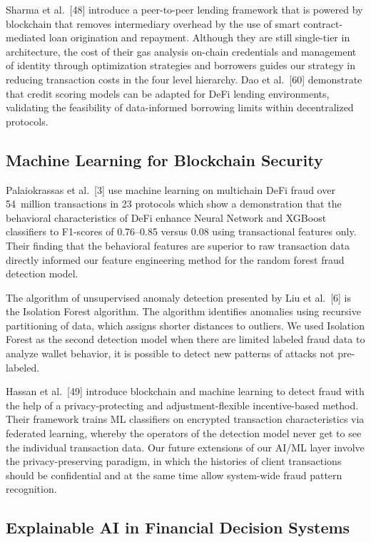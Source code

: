\documentclass[12pt,a4paper]{report}
\begin{document}
Sharma et al.~[48] introduce a peer-to-peer lending framework that is powered by blockchain that removes intermediary overhead by the use of smart contract-mediated loan origination and repayment. Although they are still single-tier in architecture, the cost of their gas analysis on-chain credentials and management of identity through optimization strategies and borrowers guides our strategy in reducing transaction costs in the four level hierarchy. Dao et al.~[60] demonstrate that credit scoring models can be adapted for DeFi lending environments, validating the feasibility of data-informed borrowing limits within decentralized protocols.

\subsection{Machine Learning for Blockchain Security}

Palaiokrassas et al.~[3] use machine learning on multichain DeFi fraud over 54~million transactions in 23 protocols which show a demonstration that the behavioral characteristics of DeFi enhance Neural Network and XGBoost classifiers to F1-scores of 0.76--0.85 versus 0.08 using transactional features only. Their finding that the behavioral features are superior to raw transaction data directly informed our feature engineering method for the random forest fraud detection model.

The algorithm of unsupervised anomaly detection presented by Liu et al.~[6] is the Isolation Forest algorithm. The algorithm identifies anomalies using recursive partitioning of data, which assigns shorter distances to outliers. We used Isolation Forest as the second detection model when there are limited labeled fraud data to analyze wallet behavior, it is possible to detect new patterns of attacks not pre-labeled.

Hassan et al.~[49] introduce blockchain and machine learning to detect fraud with the help of a privacy-protecting and adjustment-flexible incentive-based method. Their framework trains ML classifiers on encrypted transaction characteristics via federated learning, whereby the operators of the detection model never get to see the individual transaction data. Our future extensions of our AI/ML layer involve the privacy-preserving paradigm, in which the histories of client transactions should be confidential and at the same time allow system-wide fraud pattern recognition.

\subsection{Explainable AI in Financial Decision Systems}
\end{document}
